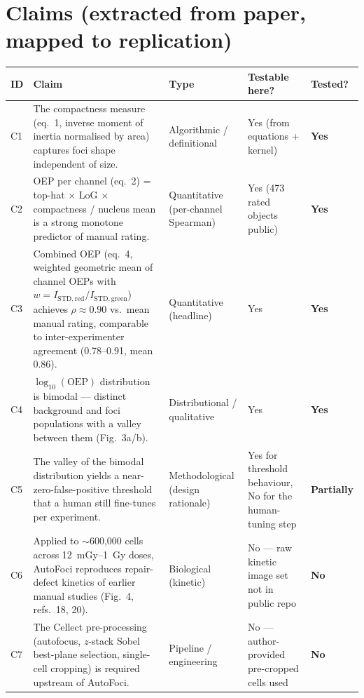 \documentclass[11pt]{article}
\begin{document}
\section{Claims (extracted from paper, mapped to replication)}
\begin{longtable}{@{}p{}p{}p{}p{}p{}@{}}
\toprule
ID & Claim & Type & Testable here? & Tested? \\
\midrule
\endhead
C1 & The compactness measure (eq.~1, inverse moment of inertia normalised by area) captures foci shape independent of size. & Algorithmic / definitional & Yes (from equations + kernel) & \textbf{Yes} \\
C2 & OEP per channel (eq.~2) = top-hat $\times$ LoG $\times$ compactness / nucleus mean is a strong monotone predictor of manual rating. & Quantitative (per-channel Spearman) & Yes (473 rated objects public) & \textbf{Yes} \\
C3 & Combined OEP (eq.~4, weighted geometric mean of channel OEPs with $w=I_{\mathrm{STD,red}}/I_{\mathrm{STD,green}}$) achieves $\rho \approx 0.90$ vs.\ mean manual rating, comparable to inter-experimenter agreement (0.78--0.91, mean 0.86). & Quantitative (headline) & Yes & \textbf{Yes} \\
C4 & $\log_{10}(\mathrm{OEP})$ distribution is bimodal --- distinct background and foci populations with a valley between them (Fig.~3a/b). & Distributional / qualitative & Yes & \textbf{Yes} \\
C5 & The valley of the bimodal distribution yields a near-zero-false-positive threshold that a human still fine-tunes per experiment. & Methodological (design rationale) & Yes for threshold behaviour, No for the human-tuning step & \textbf{Partially} \\
C6 & Applied to $\sim$600{,}000 cells across 12~mGy--1~Gy doses, AutoFoci reproduces repair-defect kinetics of earlier manual studies (Fig.~4, refs.\ 18, 20). & Biological (kinetic) & No --- raw kinetic image set not in public repo & \textbf{No} \\
C7 & The Cellect pre-processing (autofocus, $z$-stack Sobel best-plane selection, single-cell cropping) is required upstream of AutoFoci. & Pipeline / engineering & No --- author-provided pre-cropped cells used & \textbf{No} \\
\bottomrule
\end{longtable}
\end{document}
